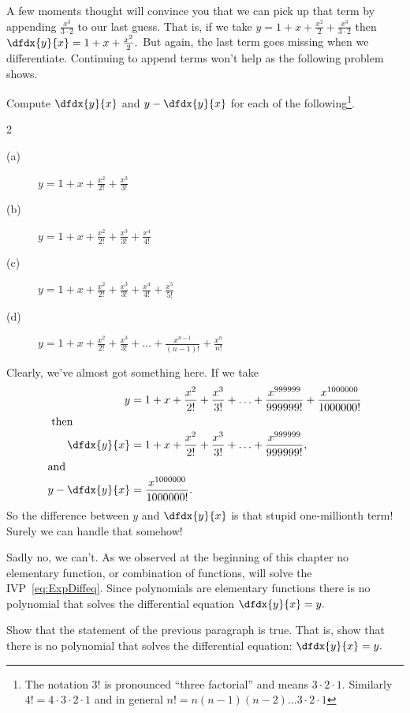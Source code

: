 A few moments thought will convince you that we can pick up that term
by appending $\frac{x^3}{3\cdot2}$ to our last guess. That is, if we take
$y=1+x+\frac{x^2}{2}+\frac{x^3}{3\cdot2}$ then
$\dfdx{y}{x} = 1+x+\frac{x^2}{2}.$ But again, the last term goes
missing when we differentiate. Continuing to append
terms won't help as the following problem shows.

\begin{embeddedproblem}{}
  Compute $\dfdx{y}{x}$ and $y-\dfdx{y}{x}$ for each of the
  following\footnote{The notation $3!$ is pronounced ``three factorial''
    and means $3\cdot2\cdot1.$ Similarly
    $4!=4\cdot3\cdot2\cdot1$ and in general $n!=n(n-1)(n-2)\ldots3\cdot2\cdot1$}.
  \begin{multicols}{2}
    \begin{description}
    \item[(a)] $y= 1+x+\frac{x^2}{2!}+\frac{x^3}{3!}$
    \item[(b)] $y= 1+x+\frac{x^2}{2!}+\frac{x^3}{3!}+\frac{x^4}{4!}$
    \item[(c)]
      $y= 1+x+\frac{x^2}{2!}+\frac{x^3}{3!}+\frac{x^4}{4!}+\frac{x^5}{5!}$
    \item[(d)]
      $y= 1+x+\frac{x^2}{2!}+\frac{x^3}{3!} + \ldots +
      \frac{x^{n-1}}{(n-1)!} + \frac{x^n}{n!}$
    \end{description}
  \end{multicols}
\end{embeddedproblem}

Clearly, we've almost got something here. If we take
\begin{align*}
  y&= 1+x+\frac{x^2}{2!}+\frac{x^3}{3!} + \ldots +
     \frac{x^{999999}}{999999!} +   \frac{x^{1000000}}{1000000!} \\
  \intertext{  then}
  \dfdx{y}{x} &= 1+x+\frac{x^2}{2!}+\frac{x^3}{3!} + \ldots +
                \frac{x^{999999}}{999999!}, \\
  \intertext{and}
  y-\dfdx{y}{x} &= \frac{x^{1000000}}{1000000!}.
\end{align*}
So the  difference between $y$ and $\dfdx{y}{x}$ is that stupid
one-millionth term! Surely we can handle that somehow!

Sadly no, we can't. As we observed at the beginning of this chapter no
elementary function, or combination of functions, will solve the
IVP~\ref{eq:ExpDiffeq}. Since polynomials are elementary functions
there is no polynomial that solves the differential equation
$\dfdx{y}{x}=y.$

\begin{embeddedproblem}{}
  Show that the statement of the previous paragraph is true. That
  is, show that there is no polynomial that solves the differential
  equation: $\dfdx{y}{x}=y.$ 
\end{embeddedproblem}

